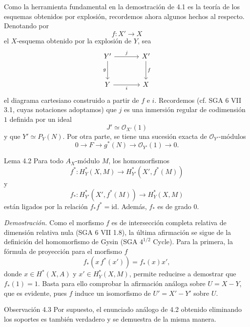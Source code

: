 Como la herramienta fundamental en la demostración de 4.1 es la teoría de los esquemas obtenidos por explosión, recordemos ahora algunos hechos al respecto. Denotando por
\[
f:X'\to X
\]
el $X$-esquema obtenido por la explosión de $Y$, sea
\[
\begin{tikzcd}[column sep=large,row sep=large]
Y' \arrow[r,"j"] \arrow[d,"g"'] & X' \arrow[d,"f"]\\
Y \arrow[r,"i"'] & X
\end{tikzcd}
\]
el diagrama cartesiano construido a partir de $f$ e $i$. Recordemos (cf. SGA 6 VII 3.1, cuyas notaciones adoptamos) que $j$ es una inmersión regular de codimensión $1$ definida por un ideal
\[
J'\simeq\mathcal O_{X'}(1)
\]
y que $Y'\simeq P_Y(N)$. Por otra parte, se tiene una sucesión exacta de $\mathcal O_{Y'}$-módulos
\[
0\to F\to g^*(N)\to \mathcal O_{Y'}(1)\to0.
\]

\begin{statement}{Lema 4.2}
Para todo $A_X$-módulo $M$, los homomorfismos
\[
f^*:H_Y^*(X,M)\to H_{Y'}^*(X',f^*(M))
\]
y
\[
f_*:H_{Y'}^*(X',f^*(M))\to H_Y^*(X,M)
\]
están ligados por la relación $f_*f^*=\mathrm{id}$. Además, $f_*$ es de grado $0$.
\end{statement}

\emph{Demostración.} Como el morfismo $f$ es de intersección completa relativa de dimensión relativa nula (SGA 6 VII 1.8), la última afirmación se sigue de la definición del homomorfismo de Gysin (SGA $4^{1/2}$ Cycle). Para la primera, la fórmula de proyección para el morfismo $f$
\[
f_*(x\,f^*(x'))=f_*(x)x',
\]
donde $x\in H^*(X,A)$ y $x'\in H_Y^*(X,M)$, permite reducirse a demostrar que $f_*(1)=1$. Basta para ello comprobar la afirmación análoga sobre $U=X-Y$, que es evidente, pues $f$ induce un isomorfismo de $U'=X'-Y'$ sobre $U$.

\begin{statement}{Observación 4.3}
Por supuesto, el enunciado análogo de 4.2 obtenido eliminando los soportes es también verdadero y se demuestra de la misma manera.
\end{statement}
